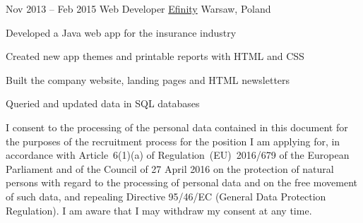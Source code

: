 \begin{sectionlist}
    \jobentry
        {Nov 2013 -- Feb 2015}
        {Web Developer}
        {\href{https://efinity.com}{Efinity}}
        {Warsaw, Poland}
        {
            \begin{jobentrylist}
                \item Developed a Java web app for the insurance industry
                \item Created new app themes and printable reports with HTML and
                    CSS
                \item Built the company website, landing pages and HTML
                    newsletters
                \item Queried and updated data in SQL databases
            \end{jobentrylist}
        }

\end{sectionlist}

\vspace*{\fill}

\footnotesize
I consent to the processing of the personal data contained in this document for
the purposes of the recruitment process for the position I am applying for, in
accordance with Article~6(1)(a) of Regulation~(EU)~2016/679 of the European
Parliament and of the Council of 27 April 2016 on the protection of natural
persons with regard to the processing of personal data and on the free movement
of such data, and repealing Directive 95/46/EC (General Data Protection
Regulation). I am aware that I may withdraw my consent at any time.
